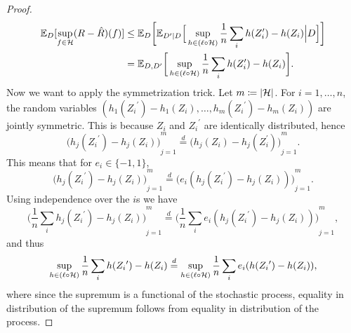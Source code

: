 \documentclass[reqno]{amsart}
\begin{document}
\begin{proposition}[Symmetrization]
\begin{proof}
\begin{align}
            \mathbb{E}_D[\sup_{f\in\mathcal{H}} (R-\hat R) (f)] &\le \mathbb{E}_D\bigg[ \mathbb{E}_{D^\prime\vert D}\Big[ \sup_{h\in(\ell\circ\mathcal H)} \frac{1}{n} \sum_i h(Z_i')-  h(Z_i) \Big\vert D\Big]\bigg] \notag\\
            &=\mathbb{E}_{D,D^\prime}\bigg[  \sup_{h\in(\ell\circ\mathcal H)} \frac{1}{n} \sum_i h(Z_i')-  h(Z_i) \bigg].\label{eq: 26}
        \end{align}
        Now we want to apply the symmetrization trick. 
        Let $m \coloneqq \vert\mathcal{H}\vert$. For $i=1,\ldots,n$, the random variables $(h_1({Z_i}^\prime)-h_1(Z_i),\ldots, h_m({Z_i}^\prime)-h_m(Z_i))$ are jointly symmetric. 
        This is because $Z_i$ and ${Z_i}^\prime$ are identically distributed, hence 
        \begin{equation}
            {\big(h_j({Z_i}^\prime) -h_j(Z_i)\big)}_{j=1}^m \overset{d}{=} {\big(h_j(Z_i) - h_j({Z_i^\prime})\big)}_{j=1}^m.
        \end{equation}
        This means that for $e_i\in\{-1,1\}$,
        \begin{equation}
            {\big(h_j({Z_i}^\prime) -h_j(Z_i)\big)}_{j=1}^m \overset{d}{=} {\big(e_i (h_j({Z_i}^\prime) - h_j(Z_i))\big)}_{j=1}^m.
        \end{equation}
        Using independence over the $i$s we have 
        \begin{equation}
             {\bigg(\frac{1}{n}\sum_i h_j({Z_i}^\prime) -h_j(Z_i)\bigg)}_{j=1}^m \overset{d}{=} {\bigg(\frac{1}{n}\sum_i e_i(h_j({Z_i}^\prime) -h_j(Z_i))\bigg)}_{j=1}^m,
        \end{equation}
        and thus 
        \begin{equation}
            \sup_{h \in(\ell \circ\mathcal{H})} \frac{1}{n}\sum_i h({Z_i}^\prime) -h(Z_i) \overset{d}{=}\sup_{h \in(\ell\circ\mathcal{H})} \frac{1}{n}\sum_i e_i(h({Z_i}^\prime) -h(Z_i)),
        \end{equation}
        where since the supremum is a functional of the stochastic process, equality in distribution of the supremum follows from equality in distribution of the process.

\end{proof}
\end{proposition}
\end{document}
